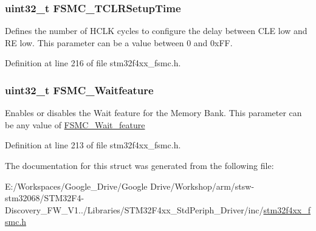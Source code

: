 \hypertarget{struct_f_s_m_c___p_c_c_a_r_d_init_type_def_ab9fd4e9d4db1fc098d5f4ccffb80bf61}{
\subsubsection[{F\-S\-M\-C\-\_\-\-T\-C\-L\-R\-Setup\-Time}]{\setlength{\rightskip}{0pt plus 5cm}uint32\-\_\-t F\-S\-M\-C\-\_\-\-T\-C\-L\-R\-Setup\-Time}}\label{struct_f_s_m_c___p_c_c_a_r_d_init_type_def_ab9fd4e9d4db1fc098d5f4ccffb80bf61}
Defines the number of H\-C\-L\-K cycles to configure the delay between C\-L\-E low and R\-E low. This parameter can be a value between 0 and 0x\-F\-F. 

Definition at line 216 of file stm32f4xx\-\_\-fsmc.\-h.

\hypertarget{struct_f_s_m_c___p_c_c_a_r_d_init_type_def_a9ecc2cc3ec6462a8a86e545c9b8ff3cf}{
\subsubsection[{F\-S\-M\-C\-\_\-\-Waitfeature}]{\setlength{\rightskip}{0pt plus 5cm}uint32\-\_\-t F\-S\-M\-C\-\_\-\-Waitfeature}}\label{struct_f_s_m_c___p_c_c_a_r_d_init_type_def_a9ecc2cc3ec6462a8a86e545c9b8ff3cf}
Enables or disables the Wait feature for the Memory Bank. This parameter can be any value of \hyperlink{group___f_s_m_c___wait__feature}{F\-S\-M\-C\-\_\-\-Wait\-\_\-feature} 

Definition at line 213 of file stm32f4xx\-\_\-fsmc.\-h.



The documentation for this struct was generated from the following file\-:\begin{DoxyCompactItemize}
\item 
E\-:/\-Workspaces/\-Google\-\_\-\-Drive/\-Google Drive/\-Workshop/arm/stsw-\/stm32068/\-S\-T\-M32\-F4-\/\-Discovery\-\_\-\-F\-W\-\_\-\-V1../\-Libraries/\-S\-T\-M32\-F4xx\-\_\-\-Std\-Periph\-\_\-\-Driver/inc/\hyperlink{stm32f4xx__fsmc_8h}{stm32f4xx\-\_\-fsmc.\-h}\end{DoxyCompactItemize}
